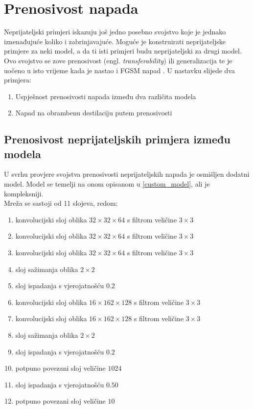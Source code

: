 \documentclass[utf8, diplomski]{fer}
\begin{document}
\section{Prenosivost napada}\label{transferability}
Neprijateljski primjeri iskazuju još jedno posebno svojstvo koje je jednako iznenađujuće koliko i zabrinjavajuće. Moguće je konstruirati neprijateljske primjere za neki model, a da ti isti primjeri budu neprijateljski za drugi model. Ovo svojstvo se zove prenosivost (engl. \textit{transferability}) ili generalizacija te je uočeno u isto vrijeme kada je nastao i FGSM napad \citep{Goodfellow2015ExplainingAH}. U nastavku slijede dva primjera: 
\begin{enumerate}[noitemsep, label=\textbullet]
\item Uspješnost prenosivosti napada između dva različita modela
\item Napad na obrambenu destilaciju putem prenosivosti
\end{enumerate}
\subsection{Prenosivost neprijateljskih primjera između modela}\label{model_transferability}
U svrhu provjere svojstva prenosivosti neprijateljskih napada je osmišljen dodatni model. Model se temelji na onom opisanom u \ref{custom_model}, ali je kompleksniji. \\
Mreža se sastoji od 11 slojeva, redom:
\begin{enumerate}[noitemsep, label=\textbullet]
  \item konvolucijski sloj oblika $32\times32\times64$ s filtrom veličine $3\times3$
  \item konvolucijski sloj oblika $32\times32\times64$ s filtrom veličine $3\times3$
  \item konvolucijski sloj oblika $32\times32\times64$ s filtrom veličine $3\times3$
  \item sloj sažimanja oblika $2\times2$
  \item sloj ispadanja s vjerojatnošću $0.2$
  \item konvolucijski sloj oblika $16\times162\times128$ s filtrom veličine $3\times3$
  \item konvolucijski sloj oblika $16\times162\times128$ s filtrom veličine $3\times3$
  \item sloj sažimanja oblika $2\times2$
  \item sloj ispadanja s vjerojatnošću $0.2$
  \item potpuno povezani sloj veličine $1024$
  \item sloj ispadanja s vjerojatnošću $0.50$
  \item potpuno povezani sloj veličine $10$
\end{enumerate}
\end{document}
